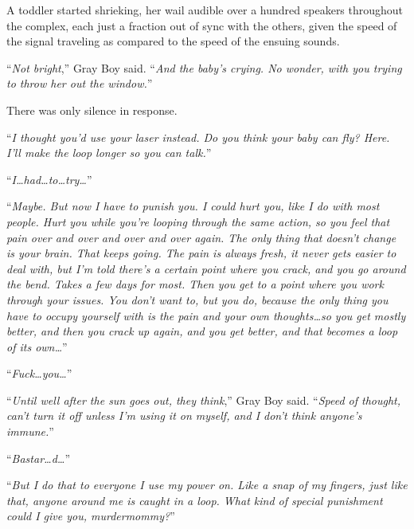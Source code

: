 A toddler started shrieking, her wail audible over a hundred speakers throughout the complex, each just a fraction out of sync with the others, given the speed of the signal traveling as compared to the speed of the ensuing sounds.



``\emph{Not bright},'' Gray Boy said.  ``\emph{And the baby's crying.  No wonder, with you trying to throw her out the window.}''



There was only silence in response.



``\emph{I thought you'd use your laser instead.  Do you think your baby can fly?  Here.  I'll make the loop longer so you can talk.}''



``\emph{I\ldots had\ldots to\ldots try\ldots}''



``\emph{Maybe.  But now I have to punish you.  I could hurt you, like I do with most people.  Hurt you while you're looping through the same action, so you feel that pain over and over and over and over again.  The only thing that doesn't change is your brain.  That keeps going.  The pain is always fresh, it never gets easier to deal with, but I'm told there's a certain point where you crack, and you go around the bend.  Takes a few days for most.  Then you get to a point where you work through your issues.  You don't want to, but you do, because the only thing you have to occupy yourself with is the pain and your own thoughts\ldots so you get mostly better, and then you crack up again, and you get better, and that becomes a loop of its own\ldots}''



``\emph{Fuck\ldots you\ldots}''



``\emph{Until well after the sun goes out, they think},'' Gray Boy said.  ``\emph{Speed of thought, can't turn it off unless I'm using it on myself, and I don't think anyone's immune.}''



``\emph{Bastar\ldots d\ldots}''



``\emph{But I do that to everyone I use my power on.  Like a snap of my fingers, just like that, anyone around me is caught in a loop.  What kind of special punishment could I give you, murdermommy?}''



